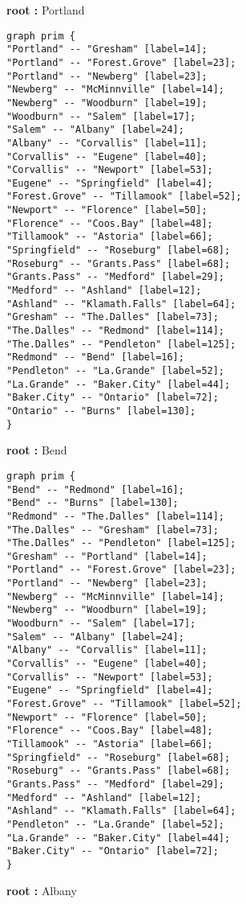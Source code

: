 \documentclass[12pt]{article}
\begin{document}
\textbf{root :} Portland
\begin{lstlisting}
graph prim {
"Portland" -- "Gresham" [label=14];
"Portland" -- "Forest.Grove" [label=23];
"Portland" -- "Newberg" [label=23];
"Newberg" -- "McMinnville" [label=14];
"Newberg" -- "Woodburn" [label=19];
"Woodburn" -- "Salem" [label=17];
"Salem" -- "Albany" [label=24];
"Albany" -- "Corvallis" [label=11];
"Corvallis" -- "Eugene" [label=40];
"Corvallis" -- "Newport" [label=53];
"Eugene" -- "Springfield" [label=4];
"Forest.Grove" -- "Tillamook" [label=52];
"Newport" -- "Florence" [label=50];
"Florence" -- "Coos.Bay" [label=48];
"Tillamook" -- "Astoria" [label=66];
"Springfield" -- "Roseburg" [label=68];
"Roseburg" -- "Grants.Pass" [label=68];
"Grants.Pass" -- "Medford" [label=29];
"Medford" -- "Ashland" [label=12];
"Ashland" -- "Klamath.Falls" [label=64];
"Gresham" -- "The.Dalles" [label=73];
"The.Dalles" -- "Redmond" [label=114];
"The.Dalles" -- "Pendleton" [label=125];
"Redmond" -- "Bend" [label=16];
"Pendleton" -- "La.Grande" [label=52];
"La.Grande" -- "Baker.City" [label=44];
"Baker.City" -- "Ontario" [label=72];
"Ontario" -- "Burns" [label=130];
}
\end{lstlisting}
\textbf{root :} Bend
\begin{lstlisting}
graph prim {
"Bend" -- "Redmond" [label=16];
"Bend" -- "Burns" [label=130];
"Redmond" -- "The.Dalles" [label=114];
"The.Dalles" -- "Gresham" [label=73];
"The.Dalles" -- "Pendleton" [label=125];
"Gresham" -- "Portland" [label=14];
"Portland" -- "Forest.Grove" [label=23];
"Portland" -- "Newberg" [label=23];
"Newberg" -- "McMinnville" [label=14];
"Newberg" -- "Woodburn" [label=19];
"Woodburn" -- "Salem" [label=17];
"Salem" -- "Albany" [label=24];
"Albany" -- "Corvallis" [label=11];
"Corvallis" -- "Eugene" [label=40];
"Corvallis" -- "Newport" [label=53];
"Eugene" -- "Springfield" [label=4];
"Forest.Grove" -- "Tillamook" [label=52];
"Newport" -- "Florence" [label=50];
"Florence" -- "Coos.Bay" [label=48];
"Tillamook" -- "Astoria" [label=66];
"Springfield" -- "Roseburg" [label=68];
"Roseburg" -- "Grants.Pass" [label=68];
"Grants.Pass" -- "Medford" [label=29];
"Medford" -- "Ashland" [label=12];
"Ashland" -- "Klamath.Falls" [label=64];
"Pendleton" -- "La.Grande" [label=52];
"La.Grande" -- "Baker.City" [label=44];
"Baker.City" -- "Ontario" [label=72];
}
\end{lstlisting}
\textbf{root :} Albany
\end{document}

